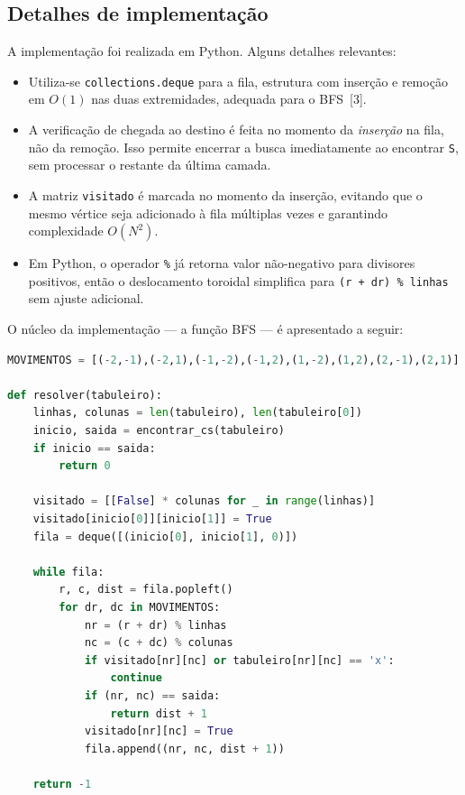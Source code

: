 \documentclass[12pt]{article}
\begin{document}
\newpage
\subsection*{Detalhes de implementação}

A implementação foi realizada em Python. Alguns detalhes relevantes:

\begin{itemize}[leftmargin=2.2em,itemsep=0.4em]
  \item Utiliza-se \texttt{collections.deque} para a fila, estrutura com inserção
        e remoção em $O(1)$ nas duas extremidades, adequada para o BFS~[3].
  \item A verificação de chegada ao destino é feita no momento da \emph{inserção}
        na fila, não da remoção. Isso permite encerrar a busca imediatamente ao
        encontrar \texttt{S}, sem processar o restante da última camada.
  \item A matriz \texttt{visitado} é marcada no momento da inserção, evitando
        que o mesmo vértice seja adicionado à fila múltiplas vezes e garantindo
        complexidade $O(N^2)$.
  \item Em Python, o operador \texttt{\%} já retorna valor não-negativo para
        divisores positivos, então o deslocamento toroidal simplifica para
        \texttt{(r + dr) \% linhas} sem ajuste adicional.
\end{itemize}

O núcleo da implementação --- a função BFS --- é apresentado a seguir:

\begin{lstlisting}[language=Python]
MOVIMENTOS = [(-2,-1),(-2,1),(-1,-2),(-1,2),(1,-2),(1,2),(2,-1),(2,1)]

def resolver(tabuleiro):
    linhas, colunas = len(tabuleiro), len(tabuleiro[0])
    inicio, saida = encontrar_cs(tabuleiro)
    if inicio == saida:
        return 0

    visitado = [[False] * colunas for _ in range(linhas)]
    visitado[inicio[0]][inicio[1]] = True
    fila = deque([(inicio[0], inicio[1], 0)])

    while fila:
        r, c, dist = fila.popleft()
        for dr, dc in MOVIMENTOS:
            nr = (r + dr) % linhas
            nc = (c + dc) % colunas
            if visitado[nr][nc] or tabuleiro[nr][nc] == 'x':
                continue
            if (nr, nc) == saida:
                return dist + 1
            visitado[nr][nc] = True
            fila.append((nr, nc, dist + 1))

    return -1
\end{lstlisting}
\end{document}
